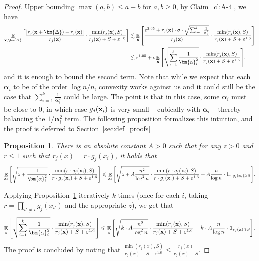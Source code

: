 \documentclass[10pt,a4paper]{article}
\newcommand{\mathbbm}[1]{\mathbf{#1}}
\newtheorem{proposition}[thm]{Proposition}
\newcommand\E{\mathop{\mathbb{E}}}
\newcommand\Expect[2]{{\mathop{\mathbb{E}}_{#1}\left[ {#2} \right]}}
\newcommand\eps{\varepsilon}
\renewcommand\geq{\geqslant}
\renewcommand\ge{\geqslant}
\renewcommand\leq{\leqslant}
\newcommand{\al}{\alpha}
\newcommand{\De}{\Delta}
\newcommand{\ve}{\varepsilon}
\def\ll{\lesssim}
\begin{document}
\begin{proof}
	Upper bounding $\max(a,b)\leq a+b$ for $a,b\geq 0$, by Claim~\ref{cl:A-4}, we have
	\begin{align*}
	\E_{{\bf x},\bm{\De}} \left[ \frac{|r_j({\bf x}+\bm{\De})-r_j({\bf x})|}{r_j({\bf x})}\cdot \frac{\min(r_j({\bf x}),S)}
	{r_j({\bf x})+S+\ve^{1.6}}\right]
    &\ll \E_{{\bf x}}
	\left[ \frac{\ve^{2.65}+r_j({\bf x})\cdot \sigma\cdot\sqrt{\sum_{i=1}^k \frac{1}{\al_i^2}}}{r_j({\bf x})}\cdot \frac{\min(r_j({\bf x}),S)}
	{r_j({\bf x})+S+\ve^{1.6}}\right]\\
    &\ll  \eps^{1.05}+\sigma\Expect{{\bf x}}{\sqrt{\sum_{i=1}^k \frac{1}{\bm{\al}_i^2}}\cdot \frac{\min(r_j({\bf x}),S)}{r_j({\bf x})+S+\ve^{1.6}}},
    \end{align*}
    and it is enough to bound the second term. Note that while we expect that each $\bm{\alpha}_i$ to be of the order $\log n/n$, convexity works against
    us and it could still be the case that $\sum\limits_{i=1}^{k}\frac{1}{\bm{\alpha}_i^2}$ could be large.
    The point is that in this case, some $\bm{\alpha}_i$ must be close to $0$, in which case $g_j({\bf x}_i)$ is very small
    -- cubically with $\bm{\alpha}_i$ -- thereby balancing the $1/\bm{\alpha}_i^2$ term. The following proposition formalizes this intuition,
    and the proof is deferred to Section~\ref{sec:def_proofs}
    \begin{proposition}\label{prop:convex_error}
      There is an absolute constant $A>0$ such that for any $z>0$ and $r\leq 1$ such that $r_j(x) = r\cdot g_j(x_i)$,
      it holds that
      \begin{equation*}
	\Expect{{\bf x}_i}{\sqrt{z+\frac{1}{\bm{\al}_i^2}} \cdot\frac{\min(r\cdot g_j({\bf x}_i),S)}
	{r\cdot g_j({\bf x}_i)+S+\ve^{1.6}}}
    \leq
	\Expect{{\bf x}_i}{\sqrt{z+A\frac{n^2}{\log^2 n}} \cdot \frac{\min(r\cdot g_j({\bf x}_i),S)}{r\cdot g_j({\bf x}_i)+S+\ve^{1.6}} +A\frac{n}{\log n} \cdot
\mathbbm{1}_{r\cdot g_j({\bf x}_i)\ge S}}.
	\end{equation*}
    \end{proposition}

    Applying Proposition~\ref{prop:convex_error} iteratively $k$ times (once for each $i$, taking $r = \prod\limits_{i'\neq i}{g_{j}(x_{i'})}$
    and the appropriate $z$), we get that
    \[
    \Expect{{\bf x}}{\sqrt{\sum_{i=1}^k \frac{1}{\bm{\al}_i^2}}\cdot \frac{\min(r_j({\bf x}),S)}{r_j({\bf x})+S+\ve^{1.6}}}
    \leq \Expect{{\bf x}}{\sqrt{k\cdot A\frac{n^2}{\log^2 n}}\cdot \frac{\min(r_j({\bf x}),S)}{r_j({\bf x})+S+\ve^{1.6}}+k\cdot A\frac{n}{\log n} \cdot
    \mathbbm{1}_{r_j({\bf x})\geq S}}.
    \]
    The proof is concluded by noting that $\frac{\min(r_j(x),S)}{r_j(x)+S+\ve^{1.6}}\leq \frac{r_j(x)}{r_j(x)+S}$.
    \end{proof}
\end{document}
